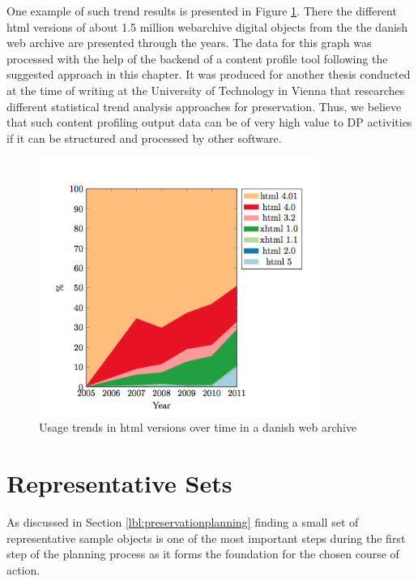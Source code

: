 One example of such trend results is presented in Figure \ref{fig:trends_html}. There the different html versions of about 1.5 million webarchive digital objects from the the danish web archive are presented through the years. The data for this graph was processed with the help of the backend of a content profile tool following the suggested approach in this chapter. It was produced for another thesis conducted at the time of writing at the University of Technology in Vienna that researches different statistical trend analysis approaches for preservation. Thus, we believe that such content profiling output data can be of very high value to DP activities if it can be structured and processed by other software.


\begin{figure}[t]
\begin{center}
\includegraphics[width=3.6in]{figures/contentprofiling/trends_html.png}
\caption{Usage trends in html versions over time in a danish web archive}
\label{fig:trends_html}
\end{center}
\end{figure}

\section{Representative Sets}
\label{sec:representative_sets}
As discussed in Section \ref{lbl:preservationplanning} finding a small set of representative sample objects is one of the most important steps during the first step of the planning process as it forms the foundation for the chosen course of action.

